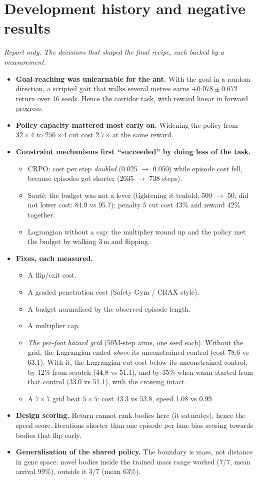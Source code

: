 \documentclass[sigconf,review]{acmart}
\begin{document}
\section{Development history and negative results}
\label{app:history}
\noindent\textit{Report only. The decisions that shaped the final recipe, each backed by a measurement.}
\begin{itemize}
\item \textbf{Goal-reaching was unlearnable for the ant.} With the goal in a random direction, a scripted gait that walks several metres earns $+0.078 \pm 0.672$ return over 16 seeds. Hence the corridor task, with reward linear in forward progress.
\item \textbf{Policy capacity mattered most early on.} Widening the policy from $32\times4$ to $256\times4$ cut cost 2.7$\times$ at the same reward.
\item \textbf{Constraint mechanisms first ``succeeded'' by doing less of the task.}
  \begin{itemize}
  \item CRPO: cost per step \emph{doubled} (0.025 $\to$ 0.050) while episode cost fell, because episodes got shorter (2035 $\to$ 738 steps).
  \item Saut\'e: the budget was not a lever (tightening it tenfold, 500 $\to$ 50, did not lower cost: 84.9 vs 95.7); penalty 5 cut cost 43\% and reward 42\% together.
  \item Lagrangian without a cap: the multiplier wound up and the policy met the budget by walking 3\,m and flipping.
  \end{itemize}
\item \textbf{Fixes, each measured.}
  \begin{itemize}
  \item A flip/exit cost.
  \item A graded penetration cost (Safety Gym / CRAX style).
  \item A budget normalised by the observed episode length.
  \item A multiplier cap.
  \item \emph{The per-foot hazard grid} (50M-step arms, one seed each). Without the grid, the Lagrangian ended \emph{above} its unconstrained control (cost 78.6 vs 63.1). With it, the Lagrangian cut cost below its unconstrained control: by 12\% from scratch (44.8 vs 51.1), and by 35\% when warm-started from that control (33.0 vs 51.1), with the crossing intact.
  \item A $7\times7$ grid beat $5\times5$: cost 43.3 vs 53.8, speed 1.08 vs 0.99.
  \end{itemize}
\item \textbf{Design scoring.} Return cannot rank bodies here (it saturates), hence the speed score. Iterations shorter than one episode per lane bias scoring towards bodies that flip early.
\item \textbf{Generalisation of the shared policy.} The boundary is mass, not distance in gene space: novel bodies inside the trained mass range worked (7/7, mean arrival 99\%), outside it 3/7 (mean 63\%).
\end{itemize}
\end{document}
